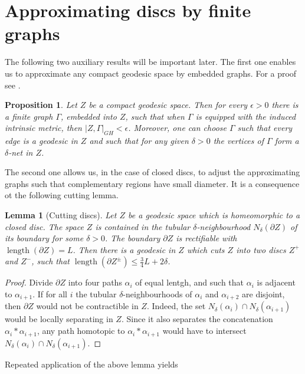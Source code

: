 \documentclass[a4paper,12pt]{article}
\newtheorem{lemma}{Lemma}
\newtheorem{proposition}{Proposition}
\theoremstyle{remark}\newtheorem*{remark}{Remark}
\theoremstyle{definition}\newtheorem{definition}{Definition}
\newcommand{\len}{\operatorname{length}}
\begin{document}
\section{Approximating discs by finite graphs}

 
The following two auxiliary results will be important later. 
The first one enables us to approximate any
compact geodesic space by embedded graphs. For a proof see \cite{}.

\begin{proposition}\label{prop:app1}
 Let $Z$ be a compact geodesic space. Then for every $\epsilon>0$ there is a 
 finite graph $\Gamma$, embedded into $Z$, such that when $\Gamma$ is equipped with 
 the induced intrinsic metric, then $|Z,\Gamma|_{GH}<\epsilon$.
 Moreover, one can choose $\Gamma$ such that every edge is a geodesic in $Z$
 and such that for any given $\delta>0$ the vertices of $\Gamma$ form a $\delta$-net
 in $Z$.
\end{proposition}

The second one allows us, in the case of closed discs, to adjust the approximating graphs 
such that complementary regions have small diameter. It is a consequence ot the following cutting
lemma.

\begin{lemma}[Cutting discs]\label{lem:cut}
Let $Z$ be a geodesic space which is homeomorphic to a closed disc. 
The space $Z$ is contained in the tubular $\delta$-neighbourhood
 $N_\delta(\partial Z)$ of its boundary for some $\delta>0$. The boundary 
 $\partial Z$ is rectifiable with $\len(\partial Z)=L$.
 Then there is a geodesic in $Z$ which cuts $Z$ into two discs $Z^+$ and $Z^-$, 
 such that $\len(\partial Z^\pm)\leq\frac{3}{4}L+2\delta$.
\end{lemma}

\begin{proof}
 Divide $\partial Z$ into four paths $\alpha_i$ of equal lentgh, 
 and such that $\alpha_i$ is adjacent to $\alpha_{i+1}$.
 If for all $i$ the tubular $\delta$-neighbourhoods of $\alpha_i$ and $\alpha_{i+2}$
 are disjoint, then $\partial Z$ would not be contractible in $Z$. Indeed, the set
 $N_\delta (\alpha_i)\cap N_\delta (\alpha_{i+1})$ would be locally separating in $Z$. 
 Since it also separates the concatenation $\alpha_i*\alpha_{i+1}$, any path homotopic to 
 $\alpha_i*\alpha_{i+1}$ would have to intersect $N_\delta (\alpha_i)\cap N_\delta (\alpha_{i+1})$.
\end{proof}

Repeated application of the above lemma yields
\end{document}
